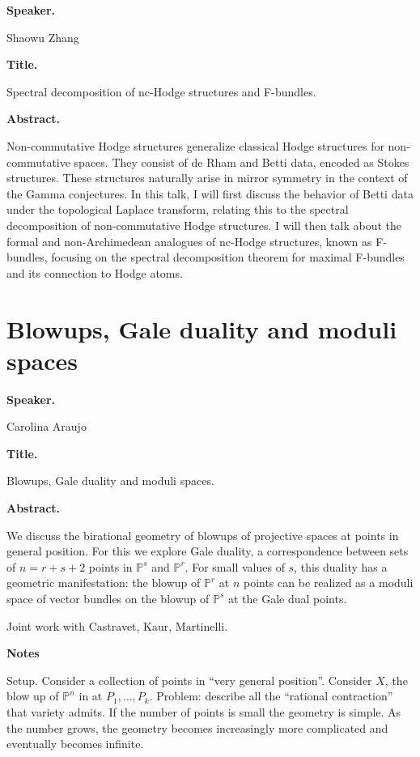 \medskip\noindent
{\bf Speaker.}

Shaowu Zhang

\medskip\noindent
{\bf Title.}

Spectral decomposition of
nc-Hodge structures and F-bundles.

\medskip\noindent
{\bf Abstract.}

Non-commutative Hodge structures
generalize classical Hodge
structures for non-commutative
spaces.
They consist of de Rham and Betti
data, encoded as Stokes structures.
These structures naturally arise in
mirror symmetry in the context of the
Gamma conjectures.
In this talk, I will first discuss
the behavior of Betti data under the
topological Laplace transform,
relating this to the spectral
decomposition of non-commutative
Hodge structures.
I will then talk about the formal
and non-Archimedean analogues of
nc-Hodge structures, known as
F-bundles, focusing on the spectral
decomposition theorem for maximal
F-bundles and its connection to
Hodge atoms.

\section{Blowups, Gale duality and moduli
spaces}
\label{section-blowups-gale-duality}

\medskip\noindent
{\bf Speaker.}

Carolina Araujo

\medskip\noindent
{\bf Title.}

Blowups, Gale duality and moduli
spaces.

\medskip\noindent
{\bf Abstract.}

We discuss the birational geometry of
blowups of projective spaces at points
in general position.
For this we explore Gale duality,
a correspondence between sets of
$n=r+s+2$ points in
$\mathbb{P}^s$ and $\mathbb{P}^r$.
For small values of $s$, this duality
has a geometric manifestation:
the blowup of $\mathbb{P}^r$ at $n$
points can be realized as a moduli
space of vector bundles on the blowup
of $\mathbb{P}^s$ at the Gale dual
points.

Joint work with Castravet, Kaur, Martinelli.

{\bf Notes} 

Setup. Consider a collection of points
in ``very general position''.
Consider $X$, the blow up of $\mathbb{P}^n$
in at $P_1,…,P_k$.
Problem: describe all the ``rational
contraction'' that variety admits.
If the number of points is small
the geometry is simple.
As the number grows, the geometry becomes
increasingly more complicated and eventually
becomes infinite.

